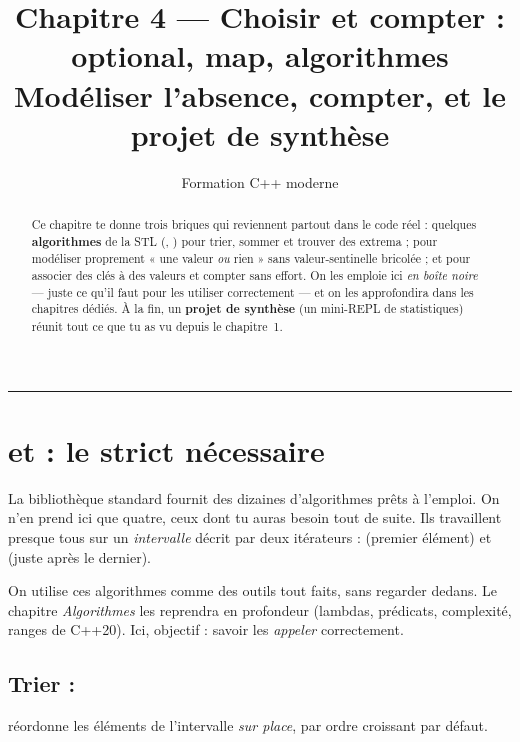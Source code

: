 \documentclass[11pt]{article}
\title{\textbf{Chapitre 4 — Choisir et compter : optional, map, algorithmes}\\[0.3em]
       \large Modéliser l'absence, compter, et le projet de synthèse}
\author{Formation C++ moderne}
\date{}
\begin{document}
\maketitle

\begin{abstract}
\noindent Ce chapitre te donne trois briques qui reviennent partout dans le
code réel : quelques \textbf{algorithmes} de la STL (,
) pour trier, sommer et trouver des extrema ; 
pour modéliser proprement « une valeur \emph{ou} rien » sans valeur-sentinelle
bricolée ; et  pour associer des clés à des valeurs et compter
sans effort. On les emploie ici \emph{en boîte noire} — juste ce qu'il faut pour
les utiliser correctement — et on les approfondira dans les chapitres dédiés.
À la fin, un \textbf{projet de synthèse} (un mini-REPL de statistiques) réunit
tout ce que tu as vu depuis le chapitre~1.
\end{abstract}

\tableofcontents
\bigskip\hrule\bigskip

\section{ et  : le strict nécessaire}

La bibliothèque standard fournit des dizaines d'algorithmes prêts à l'emploi.
On n'en prend ici que quatre, ceux dont tu auras besoin tout de suite. Ils
travaillent presque tous sur un \emph{intervalle} décrit par deux itérateurs :
 (premier élément) et  (juste après le dernier).

\begin{aretenir}
On utilise ces algorithmes comme des outils tout faits, sans regarder dedans.
Le chapitre \emph{Algorithmes} les reprendra en profondeur (lambdas,
prédicats, complexité, ranges de C++20). Ici, objectif : savoir les
\emph{appeler} correctement.
\end{aretenir}

\subsection*{Trier : }

 réordonne les éléments de l'intervalle
\emph{sur place}, par ordre croissant par défaut.
\end{document}
